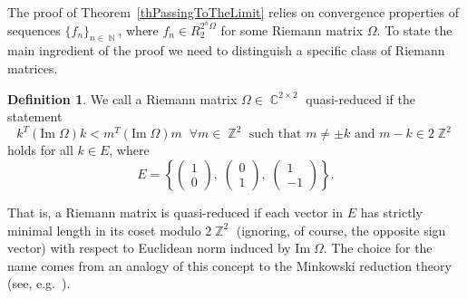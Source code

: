 \documentclass{amsart}
\numberwithin{equation}{section}
\theoremstyle{definition}
\newtheorem{definition}[theorem]{Definition}
\theoremstyle{remark}
\DeclareMathOperator{\CC}{\mathbb C}
\DeclareMathOperator{\ZZ}{\mathbb Z}
\DeclareMathOperator{\NN}{\mathbb N}
\begin{document}
	The proof of Theorem~\ref{thPassingToTheLimit} relies on convergence properties of sequences $\{f_n\}_{n \in \NN}$, where $f_n \in R_2^{2^n\Omega}$ for some Riemann matrix $\Omega$. To state the main ingredient of the proof we need to distinguish a specific class of Riemann matrices.
	
	\begin{definition}\label{defQuasiReduced}
		We call a Riemann matrix $\Omega \in \CC^{2 \times 2}$ quasi-reduced if the statement
		\[
		k^T (\mathrm{Im}\;\Omega) k < m^T (\mathrm{Im}\;\Omega) m \;\;\forall m \in \ZZ^2 \text{ such that } m \ne \pm k \text{ and } m - k \in 2\ZZ^2
		\]
		holds for all $k \in E$, where
		\[
		E = \left\{ \begin{pmatrix}
			1 \\ 0
		\end{pmatrix},\;\begin{pmatrix}
			0 \\ 1
		\end{pmatrix},\;
		\begin{pmatrix}
			1 \\ -1
		\end{pmatrix}\right\}.
		\]
	\end{definition}
	
	That is, a Riemann matrix is quasi-reduced if each vector in $E$ has strictly minimal length in its coset modulo $2\ZZ^2$ (ignoring, of course, the opposite sign vector) with respect to Euclidean norm induced by $\mathrm{Im}\;\Omega$. The choice for the name comes from an analogy of this concept to the Minkowski reduction theory (see, e.g.~\cite[\S~V.4]{Igusa}).
	
\end{document}
